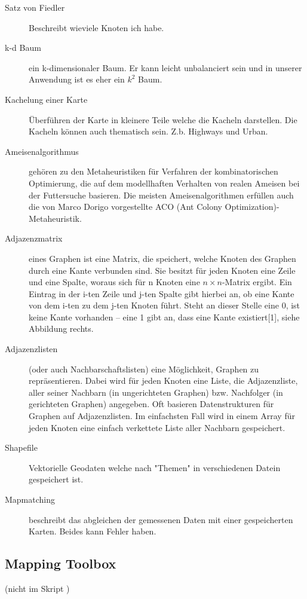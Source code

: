 \begin{description}
	\item[Satz von Fiedler] Beschreibt wieviele Knoten ich habe.
	
	\item[k-d Baum] ein k-dimensionaler Baum. Er kann leicht unbalanciert sein und in unserer Anwendung ist es eher ein $k^{2}$ Baum.
	
	\item[Kachelung einer Karte] Überführen der Karte in kleinere Teile welche die Kacheln darstellen. Die Kacheln können auch thematisch sein. Z.b. Highways und Urban.
	
	\item[Ameisenalgorithmus] gehören zu den Metaheuristiken für Verfahren der kombinatorischen Optimierung, die auf dem modellhaften Verhalten von realen Ameisen bei der Futtersuche basieren. Die meisten Ameisenalgorithmen erfüllen auch die von Marco Dorigo vorgestellte ACO (Ant Colony Optimization)-Metaheuristik. 
	
	\item[Adjazenzmatrix] eines Graphen ist eine Matrix, die speichert, welche Knoten des Graphen durch eine Kante verbunden sind. Sie besitzt für jeden Knoten eine Zeile und eine Spalte, woraus sich für n Knoten eine $n\times n$-Matrix ergibt. Ein Eintrag in der i-ten Zeile und j-ten Spalte gibt hierbei an, ob eine Kante von dem i-ten zu dem j-ten Knoten führt. Steht an dieser Stelle eine 0, ist keine Kante vorhanden – eine 1 gibt an, dass eine Kante existiert[1], siehe Abbildung rechts.
	
	\item[Adjazenzlisten] (oder auch Nachbarschaftslisten) eine Möglichkeit, Graphen zu repräsentieren. Dabei wird für jeden Knoten eine Liste, die Adjazenzliste, aller seiner Nachbarn (in ungerichteten Graphen) bzw. Nachfolger (in gerichteten Graphen) angegeben. Oft basieren Datenstrukturen für Graphen auf Adjazenzlisten. Im einfachsten Fall wird in einem Array für jeden Knoten eine einfach verkettete Liste aller Nachbarn gespeichert.

	\item[Shapefile] Vektorielle Geodaten welche nach "Themen" in verschiedenen Datein gespeichert ist.
	
	\item[Mapmatching] beschreibt das abgleichen der gemessenen Daten mit einer gespeicherten Karten. Beides kann Fehler haben.
\end{description}


\subsection{Mapping Toolbox}
(nicht im Skript )

